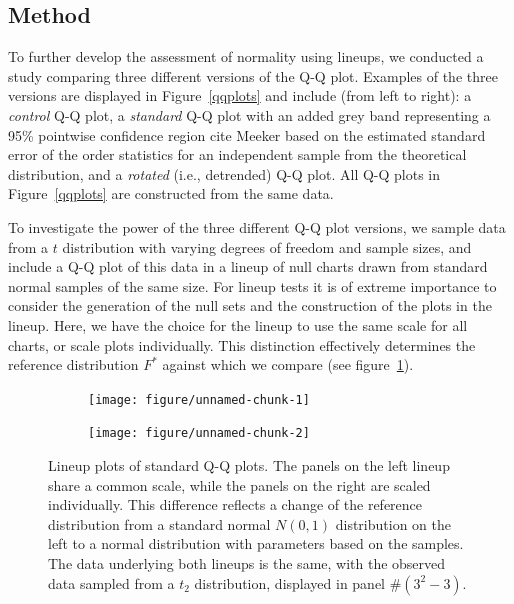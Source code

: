 \documentclass{article}\usepackage[]{graphicx}\usepackage[]{color}
\newenvironment{knitrout}{}{} %
\newcommand{\hh}[1]{{\color{magenta} #1}}
\newcommand{\al}[1]{{\color{red} #1}}
\begin{document}
\subsection{Method}

To further \al{develop} the assessment of normality using lineups, we conducted a study comparing three different versions of the Q-Q plot.
Examples of the three versions are displayed in Figure~\ref{qqplots} and include (from left to right): a \emph{control} Q-Q plot, a \emph{standard} Q-Q plot with an added grey band representing a 95\% pointwise confidence region \hh{cite Meeker} based on the estimated standard error of the order statistics for an independent sample from the theoretical distribution, and a \emph{rotated} (i.e., detrended) Q-Q plot. All Q-Q plots in Figure~\ref{qqplots} are constructed from the same data. 
 
To investigate the power of the three different Q-Q plot versions, we sample data from a $t$ distribution with varying degrees of freedom and sample sizes, and include a Q-Q plot of this data in a lineup of null charts drawn from standard normal samples of the same size.
For lineup tests it is of extreme importance to consider the generation of the null sets and the construction of the plots in the lineup. Here, we have the choice for the lineup to use the same scale for all charts, or scale plots individually. This distinction effectively determines the reference distribution $F^\ast$ against which we compare (see figure~\ref{fig:lps}).

\begin{figure}[hbt]


\begin{subfigure}{0.5\textwidth}
\begin{knitrout}
\color{fgcolor}
\texttt{[image: figure/unnamed-chunk-1]} 

\end{knitrout}

\end{subfigure}
\begin{subfigure}{0.5\textwidth}
\begin{knitrout}
\color{fgcolor}
\texttt{[image: figure/unnamed-chunk-2]} 

\end{knitrout}

\end{subfigure}
\caption{\label{fig:lps} Lineup plots of standard Q-Q plots. The panels on the left lineup share a common scale, while the panels on the right are scaled individually. This difference reflects a change of the reference distribution from a standard normal $N(0,1)$ distribution on the left to a normal distribution with parameters based on the samples. The data underlying both lineups is the same, with the observed data sampled from a $t_2$ distribution, displayed in panel \#$(3^2 - 3)$.}
\end{figure}
\end{document}
